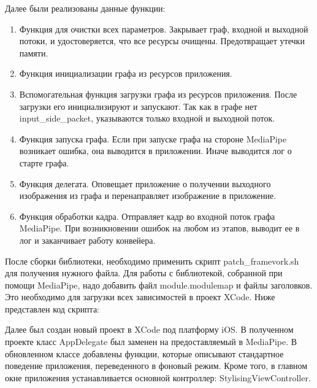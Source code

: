 \documentclass[a4paper,14pt]{extreport}
\begin{document}
        Далее были реализованы данные функции:
        \begin{enumerate}
            \item Функция для очистки всех параметров. Закрывает граф, входной и выходной потоки, и удостоверяется, что все ресурсы очищены. Предотвращает утечки памяти.
            \item Функция инициализации графа из ресурсов приложения.
            \item Вспомогательная функция загрузки графа из ресурсов приложения. После загрузки его инициализируют и запускают. Так как в графе нет input\_side\_packet, указываются только входной и выходной поток.
            \item Функция запуска графа. Если при запуске графа на стороне MediaPipe возникает ошибка, она выводится в приложении. Иначе выводится лог о старте графа.
            \item Функция делегата. Оповещает приложение о получении выходного изображения из графа и перенаправляет изображение в приложение.
            \item Функция обработки кадра. Отправляет кадр во входной поток графа MediaPipe. При возникновении ошибок на любом из этапов, выводит ее в лог и заканчивает работу конвейера.
        \end{enumerate}

        После сборки библиотеки, необходимо применить скрипт patch\_framevork.sh для получения нужного файла. Для работы с библиотекой, собранной при помощи MediaPipe, надо добавить файл module.modulemap и файлы заголовков. Это необходимо для загрузки всех зависимостей в проект XCode. Ниже представлен код скрипта:
        

        Далее был создан новый проект в XCode под платформу iOS. В полученном проекте класс AppDelegate был заменен на предоставляемый в MediaPipe. В обновленном классе добавлены функции, которые описывают стандартное поведение приложения, переведенного в фоновый режим. Кроме того, в главном окне приложения устанавливается основной контроллер: StylisingViewController.
        
\end{document}
